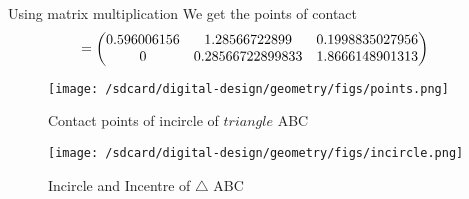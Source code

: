 \documentclass[11pt]{book}
\begin{document}
\begin{enumerate}[label=\thesubsection.\arabic*.,ref=\thesubsection.\theenumi]
Using matrix multiplication We get the points of contact 
\begin{align}
    &= \begin{pmatrix} 0.596006156 & 1.28566722899 & 0.1998835027956 \\ 0 & 0.28566722899833 & 1.8666148901313 \end{pmatrix}
\end{align}
\begin{figure}[H]
    \centering
    \texttt{[image: /sdcard/digital-design/geometry/figs/points.png]}
    \caption{Contact points of incircle of $triangle$ ABC}
    \label{fig:mat_ang1}
\end{figure}
\begin{figure}[H]
    \centering
    \texttt{[image: /sdcard/digital-design/geometry/figs/incircle.png]}
    \caption{Incircle and Incentre of $\triangle$ ABC }
    \label{fig:mat_ang2}
\end{figure}
\end{enumerate}
\end{document}
